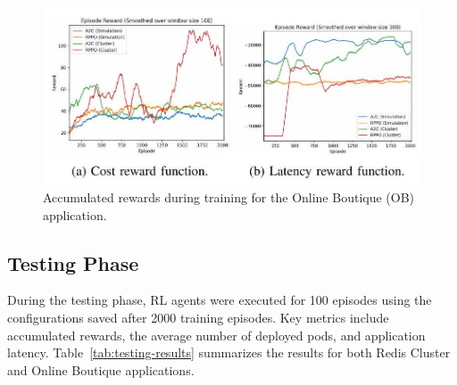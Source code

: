 \documentclass[conference]{IEEEtran}
\begin{document}
\begin{figure}[h]
    \centering
    \includegraphics[width=0.8\linewidth]{images/2024_11_17_21ad14b6196e5740bf69g-7(1)}
    \caption{Accumulated rewards during training for the Online Boutique (OB) application.}
    \label{fig:ob-rewards}
\end{figure}

\subsection{Testing Phase}

During the testing phase, RL agents were executed for 100 episodes using the configurations saved after 2000 training episodes. Key metrics include accumulated rewards, the average number of deployed pods, and application latency. Table~\ref{tab:testing-results} summarizes the results for both Redis Cluster and Online Boutique applications.
\end{document}
